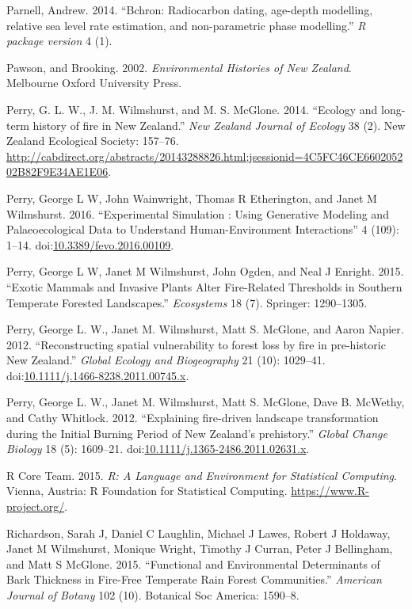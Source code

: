 \documentclass[]{article}
\begin{document}
Parnell, Andrew. 2014. ``Bchron: Radiocarbon dating, age-depth modelling, relative sea level rate estimation, and non-parametric phase modelling.'' \emph{R package version} 4 (1).

Pawson, and Brooking. 2002. \emph{Environmental Histories of New Zealand}. Melbourne Oxford University Press.

Perry, G. L. W., J. M. Wilmshurst, and M. S. McGlone. 2014. ``Ecology and long-term history of fire in New Zealand.'' \emph{New Zealand Journal of Ecology} 38 (2). New Zealand Ecological Society: 157--76. \url{http://cabdirect.org/abstracts/20143288826.html;jsessionid=4C5FC46CE660205202B82F9E34AE1E06}.

Perry, George L W, John Wainwright, Thomas R Etherington, and Janet M Wilmshurst. 2016. ``Experimental Simulation : Using Generative Modeling and Palaeoecological Data to Understand Human-Environment Interactions'' 4 (109): 1--14. doi:\href{https://doi.org/10.3389/fevo.2016.00109}{10.3389/fevo.2016.00109}.

Perry, George L W, Janet M Wilmshurst, John Ogden, and Neal J Enright. 2015. ``Exotic Mammals and Invasive Plants Alter Fire-Related Thresholds in Southern Temperate Forested Landscapes.'' \emph{Ecosystems} 18 (7). Springer: 1290--1305.

Perry, George L. W., Janet M. Wilmshurst, Matt S. McGlone, and Aaron Napier. 2012. ``Reconstructing spatial vulnerability to forest loss by fire in pre-historic New Zealand.'' \emph{Global Ecology and Biogeography} 21 (10): 1029--41. doi:\href{https://doi.org/10.1111/j.1466-8238.2011.00745.x}{10.1111/j.1466-8238.2011.00745.x}.

Perry, George L. W., Janet M. Wilmshurst, Matt S. McGlone, Dave B. McWethy, and Cathy Whitlock. 2012. ``Explaining fire-driven landscape transformation during the Initial Burning Period of New Zealand's prehistory.'' \emph{Global Change Biology} 18 (5): 1609--21. doi:\href{https://doi.org/10.1111/j.1365-2486.2011.02631.x}{10.1111/j.1365-2486.2011.02631.x}.

R Core Team. 2015. \emph{R: A Language and Environment for Statistical Computing}. Vienna, Austria: R Foundation for Statistical Computing. \url{https://www.R-project.org/}.

Richardson, Sarah J, Daniel C Laughlin, Michael J Lawes, Robert J Holdaway, Janet M Wilmshurst, Monique Wright, Timothy J Curran, Peter J Bellingham, and Matt S McGlone. 2015. ``Functional and Environmental Determinants of Bark Thickness in Fire-Free Temperate Rain Forest Communities.'' \emph{American Journal of Botany} 102 (10). Botanical Soc America: 1590--8.
\end{document}
